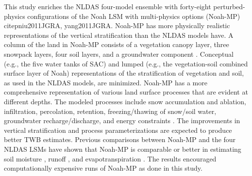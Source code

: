 \documentclass[essd]{copernicus}
\begin{document}
This study enriches the NLDAS four-model ensemble with forty-eight
perturbed-physics configurations of the Noah LSM with multi-physics options
(Noah-MP) citep{niu2011JGRA, yang2011JGRA}. Noah-MP has more physically
realistic representations of the vertical stratification than the
NLDAS models have. A column of the land in Noah-MP consists of a
vegetation canopy layer, three snowpack layers, four soil layers, and a
groundwater component \citep{niu2011JGRA}. Conceptual (e.g., the five water
tanks of SAC) and lumped (e.g., the vegetation-soil combined surface layer of
Noah) representations of the stratification of vegetation and soil, as used in
the NLDAS models, are minimized. Noah-MP has a more comprehensive
representation of various land surface processes that are evident at different
depths. The modeled processes include snow accumulation and ablation,
infiltration, percolation, retention, freezing/thawing of snow/soil water,
groundwater recharge/discharge, and energy constraints \citep{niu2011JGRA}. The
improvements in vertical stratification and process parameterizations are
expected to produce better TWB estimates. Previous comparisons between Noah-MP
and the four NLDAS LSMs have shown that Noah-MP is comparable or
better in estimating soil moisture \citep{cai2014JGRAa}, runoff
\citep{fei2021WRR, cai2014JGRAa}, and evapotranspiration \citep{zhang2020AFM}.
The results encouraged computationally expensive runs of Noah-MP as done in this
study.
\end{document}
